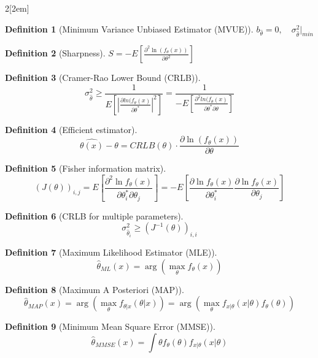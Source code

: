 \documentclass{myclass}
\newtheorem*{definition}{Definition}
\begin{document}
\begin{multicols}{2}[\columnsep2em]
\begin{definition}[Minimum Variance Unbiased Estimator (MVUE)]
$b_{\hat{\theta }}=0, \quad \sigma_{\hat{\theta }}^2|_{min}$
\end{definition}

\begin{definition}[Sharpness] $\displaystyle S = -E\left[\frac{\partial^2 \ln (f_{\theta }(x))}{\partial \theta ^2}\right]$
\end{definition}

\begin{definition}[Cramer-Rao Lower Bound (CRLB)]
\[
\sigma ^2_{\hat{\theta }} \ge \frac{1}{E\left[ \left| \frac{\partial ln (f_\theta (x)}{\partial \theta^* } \right|^2  \right]} = \frac{1}{-E\left[ \frac{\partial^2 ln (f_\theta (x)}{\partial \theta^* \partial\theta }  \right]}
\] 
\end{definition}

\begin{definition}[Efficient estimator]
\[
\hat{\theta (x)}-\theta = CRLB(\theta )\cdot \frac{\partial \ln (f_\theta (x))}{\partial \theta } 
\] 
\end{definition}

\begin{definition}[Fisher information matrix]
\[
  (J(\theta ))_{i, j} = E \left[ \frac{\partial^2 \ln f_\theta (x)}{\partial \theta^* _i \partial\theta _j} \right] = -E \left[ \frac{\partial \ln f_\theta (x)}{\partial \theta^* _i} \frac{\partial \ln f_\theta (x)}{\partial\theta _j} \right]
\] 
\end{definition}

\begin{definition}[CRLB for multiple parameters] 
\[
  \sigma ^2_{\hat{\theta}_{i}}\ge (J^{-1}(\theta ))_{i, i}
\] 
\end{definition}

\begin{definition}[Maximum Likelihood Estimator (MLE)]
\[
\hat{\theta }_{ML}(x) = \arg (\max_{\theta }f_\theta (x))
\] 
\end{definition}

\begin{definition}[Maximum A Posteriori (MAP)]
\[
\hat{\theta }_{MAP}(x) = \arg (\max_{\theta }f_{\theta |x}(\theta |x))= \arg (\max_{\theta } f_{x|\theta }(x|\theta )f_\theta (\theta ))
\] 
\end{definition}

\begin{definition}[Minimum Mean Square Error (MMSE)]
\[
\hat{\theta }_{MMSE}(x) = \int \theta f_\theta (\theta ) f_{x|\theta }(x|\theta )
\] 
\end{definition}





\end{multicols}
\end{document}
